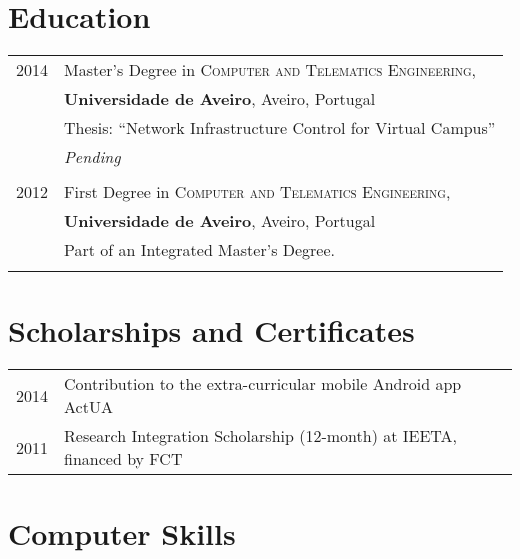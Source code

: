 \documentclass[a4paper,10pt]{article} %
\begin{document}
\section{Education}

\begin{tabular}{rl}	
\textsc{2014} & Master's Degree in \textsc{Computer and Telematics Engineering}, \\
&\textbf{Universidade de Aveiro}, Aveiro, Portugal\\
& Thesis: ``Network Infrastructure Control for Virtual Campus''\\
& \textit{Pending}\\
&\\


\textsc{2012} & First Degree in \textsc{Computer and Telematics Engineering}, \\
&\textbf{Universidade de Aveiro}, Aveiro, Portugal\\
& Part of an Integrated Master's Degree. 	\\
&\\


\end{tabular}


\section{Scholarships and Certificates}

\begin{tabular}{rl}
\textsc{2014} & Contribution to the extra-curricular mobile Android app ActUA \normalsize\\
\textsc{2011} & Research Integration Scholarship (12-month) at IEETA, financed by FCT \normalsize\\
\end{tabular}


\section{Computer Skills}
\end{document}
